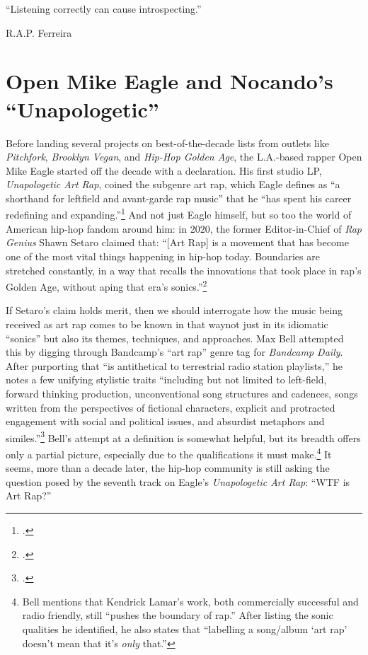 \onehalfspacing

\epigraph{{``Listening correctly can cause introspecting.''}}{R.A.P. Ferreira}

\section{Open Mike Eagle and Nocando's ``Unapologetic''}

Before landing several projects on best-of-the-decade lists from outlets like \textit{Pitchfork},
\textit{Brooklyn Vegan}, and \textit{Hip-Hop Golden Age}, the L.A.-based rapper Open Mike Eagle 
started off the decade with a declaration. His first studio LP, \textit{Unapologetic Art Rap},
coined the subgenre art rap, which Eagle defines as ``a shorthand for leftfield and avant-garde
rap music'' that he ``has spent his career redefining and expanding.''\footnote{
    \cite{openmikeeagle}.}
And not just Eagle himself, but so too the world of American hip-hop fandom around him: in 2020,
the  former Editor-in-Chief of \textit{Rap Genius} Shawn Setaro claimed that: ``[Art Rap] is a 
movement that has become one of the most vital things happening in hip-hop today. Boundaries are
stretched constantly, in a way that recalls the innovations that took place in rap's Golden Age, 
without aping that era's  sonics.''\footnote{
    \cite{shawnsetaroWhyYouShould2020}.}

If Setaro's claim holds merit, then we should interrogate how the music being received as art rap
comes to be known in that way\textemdash not just in its idiomatic ``sonics'' but also its themes,
techniques, and approaches. Max Bell attempted this by digging through Bandcamp's ``art rap'' genre
tag for \textit{Bandcamp  Daily}. After purporting that ``is antithetical to terrestrial radio 
station playlists,'' he notes a few unifying stylistic traits ``including but not limited to 
left-field, forward thinking production, unconventional song structures and cadences, songs written
from the perspectives of fictional characters, explicit and protracted engagement with social and 
political issues, and absurdist metaphors and similes.''\footnote{
    \cite{maxbellWalkAvantGardeWorld2017}.} 
Bell's attempt at a definition is somewhat helpful, but its breadth offers only a partial picture, 
especially due to the qualifications it must make.\footnote{
    Bell mentions that Kendrick Lamar's work, both commercially successful and radio friendly,
    still ``pushes the boundary of rap.'' After listing the sonic qualities he identified, he
    also states that ``labelling a song/album `art rap' doesn't mean that it's \textit{only}
    that.''} 
It seems, more than a decade later, the hip-hop community is still asking the question posed by
the seventh track on Eagle's \textit{Unapologetic Art Rap}: ``WTF is Art Rap?''

